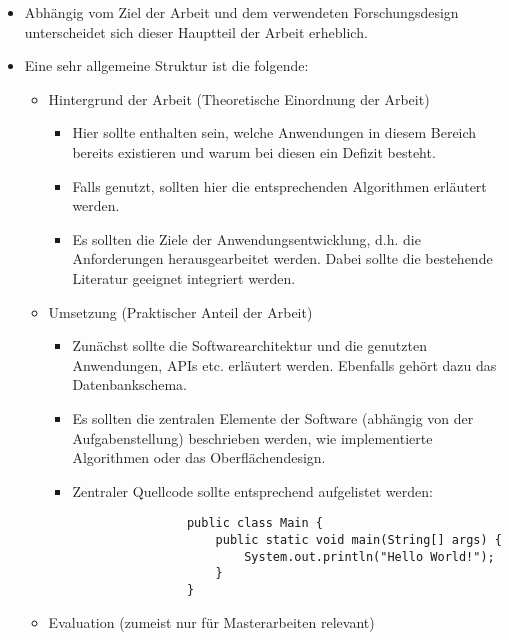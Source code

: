 \begin{itemize}
	\item Abhängig vom Ziel der Arbeit und dem verwendeten Forschungsdesign unterscheidet sich dieser Hauptteil der Arbeit erheblich. 
	\item Eine sehr allgemeine Struktur ist die folgende:
	\begin{itemize}
		\item Hintergrund der Arbeit (Theoretische Einordnung der Arbeit) 
		 	\begin{itemize}
		 		\item Hier sollte enthalten sein, welche Anwendungen in diesem Bereich bereits existieren und warum bei diesen ein Defizit besteht. 
				\item Falls genutzt, sollten hier die entsprechenden Algorithmen erläutert werden.
				\item Es sollten die Ziele der Anwendungsentwicklung, d.h. die Anforderungen herausgearbeitet werden. Dabei sollte die bestehende Literatur geeignet integriert werden.
		 	\end{itemize}
		\item Umsetzung (Praktischer Anteil der Arbeit)
			\begin{itemize}
				\item Zunächst sollte die Softwarearchitektur und die genutzten Anwendungen, APIs etc. erläutert werden. Ebenfalls gehört dazu das Datenbankschema.
				\item Es sollten die zentralen Elemente der Software (abhängig von der Aufgabenstellung) beschrieben werden, wie implementierte Algorithmen oder das Oberflächendesign.
				\item Zentraler Quellcode sollte entsprechend aufgelistet werden:
				\lstset{language=Java,basicstyle=\footnotesize,numbers=left,showstringspaces=false,frame=single}
				\begin{lstlisting}
				public class Main {
					public static void main(String[] args) {
						System.out.println("Hello World!");
					}
				}
				\end{lstlisting} 
			\end{itemize}
		\item Evaluation (zumeist nur für Masterarbeiten relevant)
		\begin{itemize}

\end{itemize}
\end{itemize}
\end{itemize}
